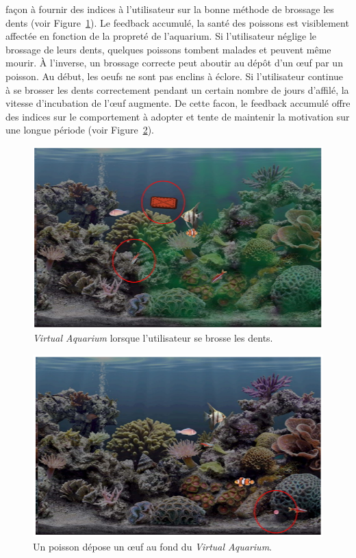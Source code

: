 \documentclass[10pt,a5paper,twoside]{article}
\begin{document}
\begin{itemize}
  façon à fournir des indices à l'utilisateur sur la bonne méthode de
  brossage les dents (voir Figure~\ref{fig:virtualaquarium2}). Le
  feedback accumulé, la santé des poissons est visiblement affectée en
  fonction de la propreté de l'aquarium. Si l'utilisateur néglige le
  brossage de leurs dents, quelques poissons tombent malades et peuvent
  même mourir. À l'inverse, un brossage correcte peut aboutir au dépôt
  d'un œuf par un poisson. Au début, les oeufs ne sont pas enclins à
  éclore. Si l'utilisateur continue à se brosser les dents correctement
  pendant un certain nombre de jours d'affilé, la vitesse d'incubation
  de l'œuf augmente. De cette facon, le feedback accumulé offre des
  indices sur le comportement à adopter et tente de maintenir la
  motivation sur une longue période (voir
  Figure~\ref{fig:virtualaquarium3}).
\end{itemize}

\begin{figure}
\centering
\includegraphics[width=0.900\hsize]{images/virtualaquarium-screenshot3.png}
\caption{\emph{Virtual Aquarium} lorsque l'utilisateur se brosse les
dents.}\label{fig:virtualaquarium2}
\end{figure}

\begin{figure}
\centering
\includegraphics[width=0.900\hsize]{images/virtualaquarium-screenshot4.png}
\caption{Un poisson dépose un œuf au fond du \emph{Virtual
Aquarium}.}\label{fig:virtualaquarium3}
\end{figure}
\end{document}
